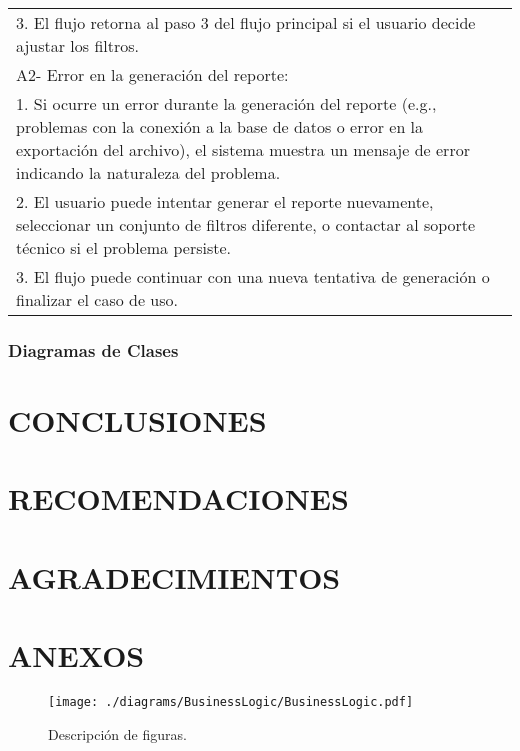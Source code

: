 \documentclass[stu, 12pt, letterpaper, donotrepeattitle, floatsintext, natbib]{apa7}
\begin{document}
\begin{longtable}{@{} p{16.5cm} @{}}
    \hspace{1cm}3. El flujo retorna al paso 3 del flujo principal si el usuario decide ajustar los filtros.                                                                                                                                                                      \\
    A2- Error en la generaci\'on del reporte:                                                                                                                                                                                                                                    \\
    \hspace{1cm}1. Si ocurre un error durante la generaci\'on del reporte (e.g., problemas con la conexi\'on a la base de datos o error en la exportaci\'on del archivo), el sistema muestra un mensaje de error indicando la naturaleza del problema.                           \\
    \hspace{1cm}2. El usuario puede intentar generar el reporte nuevamente, seleccionar un conjunto de filtros diferente, o contactar al soporte t\'ecnico si el problema persiste.                                                                                              \\
    \hspace{1cm}3. El flujo puede continuar con una nueva tentativa de generaci\'on o finalizar el caso de uso.                                                                                                                                                                  \\ \bottomrule
\end{longtable}
\subsubsection{Diagramas de Clases}



\section{\large CONCLUSIONES}
\section{\large RECOMENDACIONES}
\section{\large AGRADECIMIENTOS}

\section{\large ANEXOS}
\begin{figure}
    \caption{Descripci\'on de figuras.}
    \texttt{[image: ./diagrams/BusinessLogic/BusinessLogic.pdf]}
\end{figure}
\end{document}
